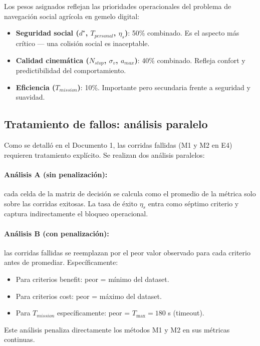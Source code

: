 \documentclass[12pt,a4paper,oneside]{book}
\begin{document}
Los pesos asignados reflejan las prioridades operacionales del problema de navegación social agrícola en gemelo digital:
\begin{itemize}
    \item \textbf{Seguridad social ($d^\star$, $T_{personal}$, $\eta_s$)}: 50\% combinado. Es el aspecto más crítico --- una colisión social es inaceptable.
    \item \textbf{Calidad cinemática ($N_{stop}$, $\sigma_v$, $a_{max}$)}: 40\% combinado. Refleja confort y predictibilidad del comportamiento.
    \item \textbf{Eficiencia ($T_{mission}$)}: 10\%. Importante pero secundaria frente a seguridad y suavidad.
\end{itemize}

\subsection{Tratamiento de fallos: análisis paralelo}

Como se detalló en el Documento 1, las corridas fallidas (M1 y M2 en E4) requieren tratamiento explícito. Se realizan dos análisis paralelos:

\paragraph{Análisis A (sin penalización):} cada celda de la matriz de decisión se calcula como el promedio de la métrica solo sobre las corridas exitosas. La tasa de éxito $\eta_s$ entra como séptimo criterio y captura indirectamente el bloqueo operacional.

\paragraph{Análisis B (con penalización):} las corridas fallidas se reemplazan por el peor valor observado para cada criterio antes de promediar. Específicamente:
\begin{itemize}
    \item Para criterios benefit: peor = mínimo del dataset.
    \item Para criterios cost: peor = máximo del dataset.
    \item Para $T_{mission}$ específicamente: peor = $T_{\max} = 180$ s (timeout).
\end{itemize}
Este análisis penaliza directamente los métodos M1 y M2 en sus métricas continuas.

\newpage
\end{document}
